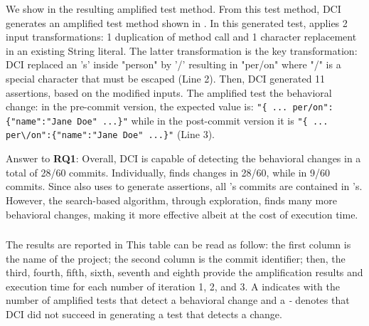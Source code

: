 We show in  
the resulting amplified test method.
From this test method, DCI generates an amplified test method shown in . 
In this generated test, \sbampl applies 2 input transformations: 1 duplication of method call and 1 character replacement in an existing String literal.
The latter transformation is the key transformation: DCI replaced an 's' inside "person" by '/' resulting in "per/on" where "/" is a special character that must be escaped (Line 2). 
Then, DCI generated 11 assertions, based on the modified inputs. 
The amplified test the behavioral change:
in the pre-commit version, the expected value is: \texttt{"\{ ... per/on":\{"name":"Jane Doe" ...\}"} while in the post-commit version it is \texttt{"\{ ... per\textbackslash/on":\{"name":"Jane Doe" ...\}"} (Line 3).
 
\begin{mdframed}
Answer to \textbf{RQ1}: Overall, DCI is capable of detecting the behavioral changes in a total of 28/60 commits. Individually, \DCII finds changes in 28/60, while \DCIA in 9/60 commits.
Since \DCII also uses \aampl to generate assertions, all \DCIA's commits are contained in \DCII's. However, the search-based algorithm, through exploration, finds many more behavioral changes, making it more effective albeit at the cost of execution time.
\end{mdframed}


\subsubsection{\rqiteration}
\label{subsubsec:answerqiteration}

The results are reported in 
This table can be read as follow:
the first column is the name of the project;
the second column is the commit identifier;
then, the third, fourth, fifth, sixth, seventh and eighth provide the amplification results and execution time for each number of iteration 1, 2, and 3. A \cmark indicates with the number of amplified tests that detect a behavioral change and a \textit{-} denotes that DCI did not succeed in generating a test that detects a change.

